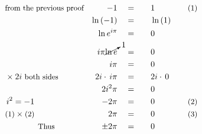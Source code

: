 \begin{alignat*}{5}
&\small\text{from the previous proof}&-1\quad&=\quad&&1\qquad\quad&\small\text{(1)}\\
&\,&\ln{(-1)}\quad&=&&\ln{(1)}\\
&\,&\ln{e^{i\pi}}\quad&=&&0\\
&\,&i\pi\cancelto{1}{\ln{e}}\quad&=&&0\\
&\,&i\pi\quad&=&&0\\
&\small\times2i\text{ both sides}&2i\cdot\,i\pi\quad&=&&2i\cdot\,0\\
&\,&2i^2\pi\quad&=&&0\\
&\small\,i^2=-1&-2\pi\quad&=&&0&\small\text{(2)}\\
&\small\text{(1)}\times\text{(2)}&2\pi\quad&=&&0&\small\text{(3)}\\
&\qquad\qquad\small\text{Thus}&\pm2\pi\quad&=&&0
\end{alignat*}
